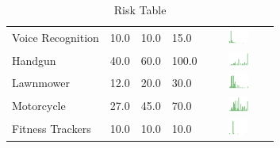 \begin{table}[t]
\begin{center}
\begin{tabular}{| p{2cm} | p{1cm} | p{1cm} | p{1cm} | c |}
Voice Recognition  & 10.0 & 10.0 & 15.0 & \includegraphics[width = 2cm, height = 0.5cm]{tables/voicerecognitionrisk} \\ 
Handgun & 40.0 & 60.0 & 100.0 & \includegraphics[width = 2cm, height = 0.5cm]{tables/HandgunRisk} \\ 
Lawnmower & 12.0 & 20.0 & 30.0 & \includegraphics[width = 2cm, height = 0.5cm]{tables/LawnmowerRisk} \\ 
Motorcycle & 27.0 & 45.0 & 70.0 & \includegraphics[width = 2cm, height = 0.5cm]{tables/MotorcycleRisk} \\ 
Fitness Trackers  & 10.0 & 10.0 & 10.0 & \includegraphics[width = 2cm, height = 0.5cm]{tables/fitnesstrackersrisk} \\ 
\hline
\end{tabular}
\caption{Risk Table}
\label{top10}
\end{center}
\end{table}
